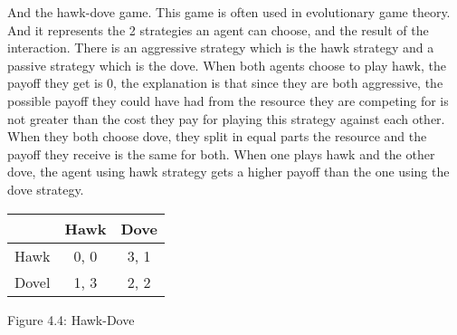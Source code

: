 \documentclass{article}
\begin{document}
And the hawk-dove game. This game is often used in  evolutionary game theory. And it represents the 2 strategies an agent can choose,  and the result of the interaction. There is an aggressive strategy which is the hawk strategy and a passive strategy which is the dove. When both agents choose to play hawk, the payoff they get is 0, the explanation is that since they are both aggressive, the possible payoff they could have had from the resource they are competing for is not greater than the cost they pay for playing this strategy against each other. When they both choose dove, they split in equal parts the resource and the payoff they receive is the same for both. When one plays hawk and the other dove, the agent using hawk strategy gets a higher payoff than the one using the dove strategy.    
\begin{center}
\begin{tabular}{|l|c|c|}
\hline
 & Hawk & Dove \\ 
\hline
Hawk & 0, 0 & 3, 1\\
\hline
 Dovel & 1, 3 & 2, 2\\
\hline
\end{tabular}
\end{center}
\begin{center}
	Figure 4.4: Hawk-Dove
\end{center}
\end{document}
